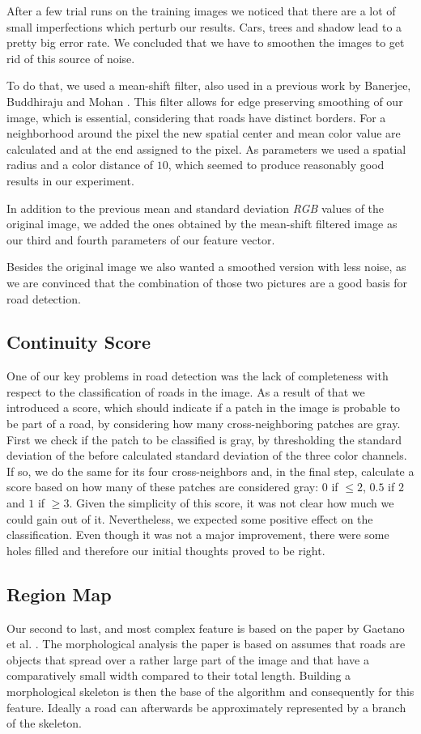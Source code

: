 \documentclass[10pt,conference,compsocconf]{IEEEtran}
\begin{document}
After a few trial runs on the training images we noticed that there are a lot of small imperfections which perturb our results. Cars, trees and shadow lead to a pretty big error rate. We concluded that we have to smoothen the images to get rid of this source of noise.

To do that, we used a mean-shift filter, also used in a previous work by Banerjee, Buddhiraju and Mohan \cite{BaBuMo12}. This filter allows for edge preserving smoothing of our image, which is essential, considering that roads have distinct borders. For a neighborhood around the pixel the new spatial center and mean color value are calculated and at the end assigned to the pixel. As parameters we used a spatial radius and a color distance of $10$, which seemed to produce reasonably good results in our experiment.

In addition to the previous mean and standard deviation \emph{RGB} values of the original image, we added the ones obtained by the mean-shift filtered image as our third and fourth parameters of our feature vector. 

Besides the original image we also wanted a smoothed version with less noise, as we are convinced that the combination of those two pictures are a good basis for road detection.

\subsection{Continuity Score}
\label{sec:continuity_score}
One of our key problems in road detection was the lack of completeness with respect to the classification of roads in the image. As a result of that we introduced a score, which should indicate if a patch in the image is probable to be part of a road, by considering how many cross-neighboring patches are gray. First we check if the patch to be classified is gray, by thresholding the standard deviation of the before calculated standard deviation of the three color channels. If so, we do the same for its four cross-neighbors and, in the final step, calculate a score based on how many of these patches are considered gray: $0$ if $\leq2$, $0.5$ if $2$ and $1$ if $\geq3$.
Given the simplicity of this score, it was not clear how much we could gain out of it. Nevertheless, we expected some positive effect on the classification. Even though it was not a major improvement, there were some holes filled and therefore our initial thoughts proved to be right.

\subsection{Region Map}
Our second to last, and most complex feature is based on the paper by Gaetano et al. \cite{GaZeScPo11}. The morphological analysis the paper is based on assumes that roads are objects that spread over a rather large part of the image and that have a comparatively small width compared to their total length. Building a morphological skeleton is then the base of the algorithm and consequently for this feature. Ideally a road can afterwards be approximately represented by a branch of the skeleton.
\end{document}
